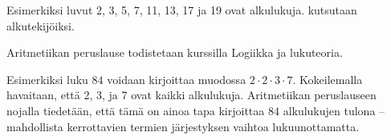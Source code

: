     Esimerkiksi luvut 2, 3, 5, 7, 11, 13, 17 ja 19 ovat alkulukuja.
    kutsutaan alkutekijöiksi.
    
    
   Aritmetiikan peruslause todistetaan kurssilla Logiikka ja lukuteoria.
    
    Esimerkiksi luku $84$ voidaan kirjoittaa muodossa $2\cdot 2\cdot 3\cdot 7$. Kokeilemalla havaitaan, että 2, 3, ja 7 ovat kaikki alkulukuja. Aritmetiikan peruslauseen nojalla tiedetään, että tämä on ainoa tapa kirjoittaa $84$ alkulukujen tulona -- mahdollista kerrottavien termien järjestyksen vaihtoa lukuunottamatta.
    
    
    

